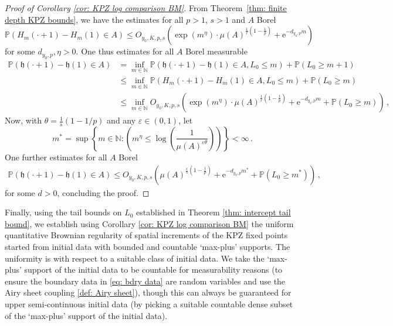 \documentclass[11pt, reqno]{amsart}
\numberwithin{equation}{section}
\newcommand{\PP}{\ensuremath{\mathbb{P}}}
\begin{document}
\begin{proof}[Proof of Corollary \ref{cor: KPZ log comparison BM}]
From Theorem~\ref{thm: finite depth KPZ bounds}, we have the estimates for all $p>1$, $s>1$ and $A$ Borel
\begin{equation*}
    \PP \left( H_m(\cdot + 1)-H_m(1)\in A \right)\le O_{y_0, K, p,s}\left(\exp(m^\eta)\cdot \mu(A)^{\frac{1}{r}(1-\frac{1}{p})}+ \mathrm{e}^{-d_{y_0, p} m}\right)
\end{equation*}
for some $d_{y_0,p}, \eta > 0$.
One thus estimates for all $A$ Borel measurable 
\begin{equation*}
\begin{array}{ll}
     \PP(\mathfrak{h}(\cdot + 1)-\mathfrak{h}(1)\in A) &= \displaystyle\inf_{m\in \mathbb{N}}\PP(\mathfrak{h}(\cdot + 1)-\mathfrak{h}(1)\in A, L_0\le m) + \PP(L_0\geq m+1) \\
     & \le \displaystyle\inf_{m\in \mathbb{N}}\PP(H_m(\cdot+1)-H_m(1)\in A, L_0\le m) + \PP(L_0\geq m)\\
     & \le  \displaystyle\inf_{m\in \mathbb{N}} O_{y_0, K, p,s}\left(\exp(m^\eta)\cdot \mu(A)^{\frac{1}{r}(1-\frac{1}{p})}+ \mathrm{e}^{-d_{y_0, p} m}+\PP(L_0 \ge m)\right)\,,
\end{array}
\end{equation*}
Now, with $\theta = \frac{1}{s}(1-1/p)$ and any $\varepsilon \in (0,1)$, let 
\begin{equation*}
m^* =  \displaystyle \sup \left\{m\in \mathbb{N} :  \left(m^\eta \le \log \left(\frac{1}{ \mu(A)^{\varepsilon\theta}}\right)\right)\right\}<\infty\,.
\end{equation*}
One further estimates for all $A$ Borel
\begin{equation*}
\begin{array}{cc}
     \PP(\mathfrak{h}(\cdot + 1)-\mathfrak{h}(1)\in A) \le O_{y_0, K, p,s}\left(\mu(A)^{\frac{\varepsilon}{s}(1-\frac{1}{p})} + \mathrm{e}^{-d_{y_0, p}m^*} +  \PP(L_0\geq m^{*})\right)\,,
\end{array}
\end{equation*}
for some $d > 0$, concluding the proof. 
\end{proof}

Finally, using the tail bounds on $L_0$ established in Theorem \ref{thm: intercept tail bound}, we establish using Corollary \ref{cor: KPZ log comparison BM} the uniform quantitative Brownian regularity of spatial increments of the KPZ fixed points started from initial data with bounded and countable `max-plus' supports. The uniformity is with respect to a suitable class of initial data. We take the `max-plus' support of the initial data to be countable for measurability reasons (to ensure the boundary data in \eqref{eq: bdry data} are random variables and use the Airy sheet coupling \ref{def: Airy sheet}), though this can always be guaranteed for upper semi-continuous initial data (by picking a suitable countable dense subset of the `max-plus' support of the initial data).
\end{document}
